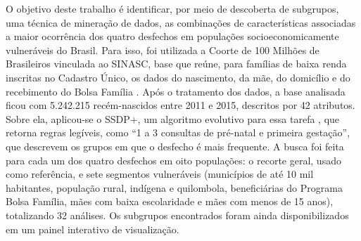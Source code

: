 
O objetivo deste trabalho é identificar, por meio de descoberta de subgrupos, uma técnica de mineração de dados, as combinações de características associadas a maior ocorrência dos quatro desfechos em populações socioeconomicamente vulneráveis do Brasil. Para isso, foi utilizada a Coorte de 100 Milhões de Brasileiros vinculada ao SINASC, base que reúne, para famílias de baixa renda inscritas no Cadastro Único, os dados do nascimento, da mãe, do domicílio e do recebimento do Bolsa Família \cite{pita2018}. Após o tratamento dos dados, a base analisada ficou com 5.242.215 recém-nascidos entre 2011 e 2015, descritos por 42 atributos. Sobre ela, aplicou-se o SSDP+, um algoritmo evolutivo para essa tarefa \cite{lucas2018}, que retorna regras legíveis, como ``1 a 3 consultas de pré-natal e primeira gestação'', que descrevem os grupos em que o desfecho é mais frequente. A busca foi feita para cada um dos quatro desfechos em oito populações: o recorte geral, usado como referência, e sete segmentos vulneráveis (municípios de até 10 mil habitantes, população rural, indígena e quilombola, beneficiárias do Programa Bolsa Família, mães com baixa escolaridade e mães com menos de 15 anos), totalizando 32 análises. Os subgrupos encontrados foram ainda disponibilizados em um painel interativo de visualização.

